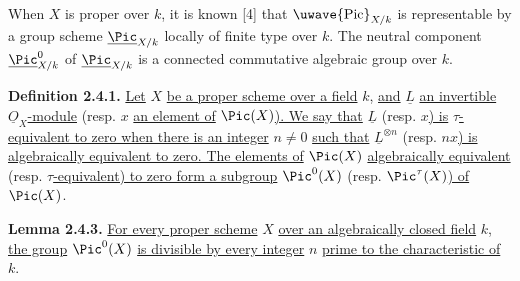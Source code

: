 \providecommand{\Filt}{\operatorname{Fil}}
\providecommand{\fpqc}{\mathrm{fpqc}}
\providecommand{\Sch}{\operatorname{Sch}}
\renewcommand{\Ob}{\operatorname{ob}}
\providecommand{\Gm}{\mathbb G_m}
\providecommand{\Der}{\operatorname{Der}}
\providecommand{\SL}{\operatorname{SL}}
\providecommand{\Aut}{\operatorname{Aut}}
\providecommand{\Mod}{\operatorname{Mod}}
\providecommand{\Tors}{\operatorname{Tors}}
\providecommand{\Mat}{\operatorname{Mat}}
\providecommand{\len}{\operatorname{long}}
\renewcommand{\id}{\operatorname{id}}
\providecommand{\Spec}{\operatorname{Spec}}
\providecommand{\Picf}{\operatorname{Pic}}
\providecommand{\Ens}{\operatorname{Ens}}
\providecommand{\clp}{\operatorname{cl}_{P}}
\providecommand{\clo}{\operatorname{cl}^{\circ}}
\providecommand{\clb}{\operatorname{cl}_{\bullet}}
\providecommand{\Grb}{\operatorname{Gr}_{\bullet}}
\providecommand{\Gro}{\operatorname{Gr}^{\bullet}}
\providecommand{\longO}[1]
{\operatorname{length}_{#1}}

\renewcommand{\Gro}{\operatorname{Gr}^{\bullet}}

%

When \(X\) is proper over \(k\), it is known [4] that \(\text{\uwave{Pic}}_{X/k}\) is representable by a group scheme \(\underline{\Pic}_{X/k}\) locally of finite type over \(k\). The neutral component \(\underline{\Pic}^0_{X/k}\) of \(\underline{\Pic}_{X/k}\) is a connected commutative algebraic group over \(k\).

\textbf{Definition 2.4.1.} \uline{Let} \(X\) \uline{be a proper scheme over a field} \(k\), \uline{and} \(\underline{L}\) \uline{an invertible} \(\underline{O}_X\)\uline{-module} (resp. \(x\) \uline{an element of} \(\Pic(X)\)\uline{). We say that} \(\underline{L}\) (resp. \(x\)\uline{) is} \(\tau\)\uline{-equivalent to zero when there is an integer} \(n\ne0\) \uline{such that} \(\underline{L}^{\otimes n}\) (resp. \(nx\)\uline{) is algebraically equivalent to zero. The elements of} \(\Pic(X)\) \uline{algebraically equivalent} (resp. \(\tau\)\uline{-equivalent) to zero form a subgroup} \(\Pic^0(X)\) (resp. \(\Pic^\tau(X)\)\uline{) of} \(\Pic(X)\).

\textbf{Lemma 2.4.3.} \uline{For every proper scheme} \(X\) \uline{over an algebraically closed field} \(k\), \uline{the group} \(\Pic^0(X)\) \uline{is divisible by every integer} \(n\) \uline{prime to the characteristic of} \(k\).

